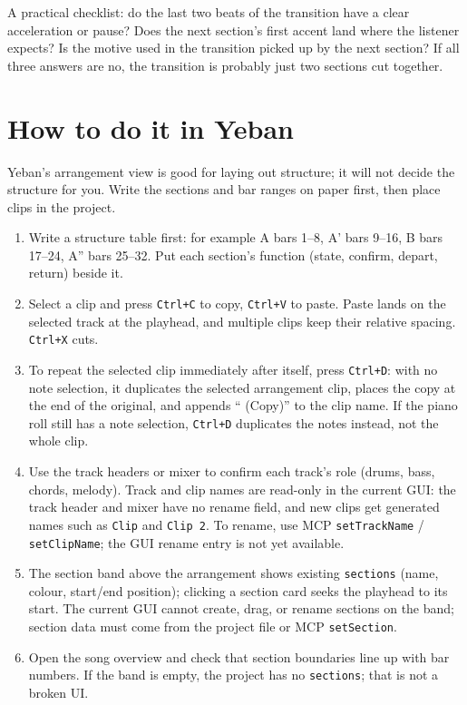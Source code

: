 A practical checklist: do the last two beats of the transition have a clear acceleration or pause? Does the next section's first accent land where the listener expects? Is the motive used in the transition picked up by the next section? If all three answers are no, the transition is probably just two sections cut together.

\section{How to do it in Yeban}

Yeban's arrangement view is good for laying out structure; it will not decide the structure for you. Write the sections and bar ranges on paper first, then place clips in the project.

\begin{enumerate}
  \item Write a structure table first: for example A bars 1--8, A' bars 9--16, B bars 17--24, A'' bars 25--32. Put each section's function (state, confirm, depart, return) beside it.
  \item Select a clip and press \texttt{Ctrl+C} to copy, \texttt{Ctrl+V} to paste. Paste lands on the selected track at the playhead, and multiple clips keep their relative spacing. \texttt{Ctrl+X} cuts.
  \item To repeat the selected clip immediately after itself, press \texttt{Ctrl+D}: with no note selection, it duplicates the selected arrangement clip, places the copy at the end of the original, and appends `` (Copy)'' to the clip name. If the piano roll still has a note selection, \texttt{Ctrl+D} duplicates the notes instead, not the whole clip.
  \item Use the track headers or mixer to confirm each track's role (drums, bass, chords, melody). Track and clip names are read-only in the current GUI: the track header and mixer have no rename field, and new clips get generated names such as \texttt{Clip} and \texttt{Clip 2}. To rename, use MCP \texttt{setTrackName} / \texttt{setClipName}; the GUI rename entry is not yet available.
  \item The section band above the arrangement shows existing \texttt{sections} (name, colour, start/end position); clicking a section card seeks the playhead to its start. The current GUI cannot create, drag, or rename sections on the band; section data must come from the project file or MCP \texttt{setSection}.
  \item Open the song overview and check that section boundaries line up with bar numbers. If the band is empty, the project has no \texttt{sections}; that is not a broken UI.
\end{enumerate}

